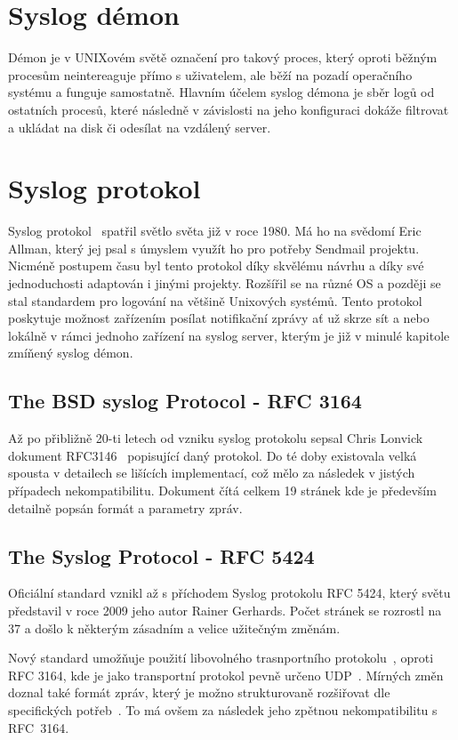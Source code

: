 \documentclass[thesis=B,czech]{FITthesis}[2012/06/26]
\begin{document}
\section{Syslog démon}
Démon je v UNIXovém světě označení pro takový proces, který oproti běžným procesům neintereaguje přímo s uživatelem, ale běží na pozadí operačního systému a funguje samostatně. Hlavním účelem syslog démona je sběr logů od ostatních procesů, které následně v závislosti na jeho konfiguraci dokáže filtrovat a ukládat na disk či odesílat na vzdálený server.

\section{Syslog protokol}
Syslog protokol~\cite{NetworkAdmSurGuide} spatřil světlo světa již v roce 1980. Má ho na svědomí Eric Allman, který jej psal s úmyslem využít ho pro potřeby Sendmail projektu. Nicméně postupem času byl tento protokol díky skvělému návrhu a díky své jednoduchosti adaptován i jinými projekty. Rozšířil se na různé OS a později se stal standardem pro logování na většině Unixových systémů.
Tento protokol poskytuje možnost zařízením posílat notifikační zprávy ať už skrze sít a nebo lokálně v rámci jednoho zařízení na syslog server, kterým je již v minulé kapitole zmíňený syslog démon.

\subsection{The BSD syslog Protocol - RFC 3164}
Až po přibližně 20-ti letech od vzniku syslog protokolu sepsal Chris Lonvick dokument RFC3146~\cite{RFC3164} popisující daný protokol. Do té doby existovala velká spousta v detailech se lišících implementací, což mělo za následek v jistých případech nekompatibilitu. Dokument čítá celkem 19 stránek kde je především detailně popsán formát a parametry zpráv.

\subsection{The Syslog Protocol - RFC 5424}
Oficiální standard vznikl až s příchodem Syslog protokolu RFC 5424, který světu představil v roce 2009 jeho autor Rainer Gerhards. Počet stránek se rozrostl na 37 a došlo k některým zásadním a velice užitečným změnám.

Nový standard umožňuje použití libovolného trasnportního protokolu~\cite{RFC5424-TrProt}, oproti RFC 3164, kde je jako transportní protokol pevně určeno UDP~\cite{RFC3164-UDP}.
Mírných změn doznal také formát zpráv, který je možno strukturovaně rozšiřovat dle specifických potřeb~\cite{RFC5424-MsgForm}. To má ovšem za následek jeho zpětnou nekompatibilitu s RFC~3164.
\end{document}
